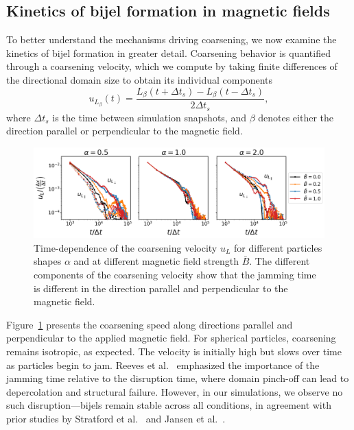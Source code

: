 \subsection{Kinetics of bijel formation in magnetic fields}

To better understand the mechanisms driving coarsening, we now examine the kinetics of bijel formation in greater detail. Coarsening behavior 
is quantified through a coarsening velocity, which we compute by taking finite differences of the directional domain size to obtain its individual components
    \begin{equation}
    u_{L_\beta}(t) = \frac{L_\beta(t+\Delta t_s)-L_\beta(t-\Delta t_s)}{2\Delta t_s} ,
    \end{equation}
    where \(\Delta t_s\) is the time between simulation
    snapshots, and $\beta$ denotes either the direction parallel or perpendicular to the magnetic field.
    
    \begin{figure}
    \includegraphics[width=\textwidth]{../figures/results/paper1/coarsening_vel.png}
    \caption{Time-dependence of the coarsening velocity $u_L$ for different particles shapes $\alpha$  and at different magnetic 
    field strength $\bar{B}$. The different components of the coarsening velocity show that the jamming time is different in the 
    direction parallel and perpendicular to the magnetic field.}
    \label{fig:coarsening_velocity}
    \end{figure}
    
Figure~\ref{fig:coarsening_velocity} presents the coarsening speed along directions parallel and perpendicular to the applied magnetic field. For 
spherical particles, coarsening remains isotropic, as expected. The velocity is initially high but slows over time as particles begin to jam. 
Reeves et al.~\cite{reeves_particle-size_2015} emphasized the importance of the jamming time relative to the disruption time, where domain pinch-off can 
lead to depercolation and structural failure. However, in our simulations, we observe no such disruption—bijels remain stable across all conditions, in 
agreement with prior studies by Stratford et al.~\cite{stratford_colloidal_2005} and Jansen et al.~\cite{jansen_bijels_2011}.
    
